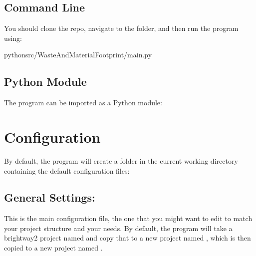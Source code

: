 \documentclass[letterpaper,10pt,english]{sphinxmanual}
\begin{document}
\section{Command Line}
\label{\detokenize{usage:command-line}}
\sphinxAtStartPar
You should clone the repo, navigate to the  folder, and then run the program using:

\begin{sphinxVerbatim}[commandchars=\\\{\}]
pythonsrc/WasteAndMaterialFootprint/main.py
\end{sphinxVerbatim}


\section{Python Module}
\label{\detokenize{usage:python-module}}
\sphinxAtStartPar
The program can be imported as a Python module:

\begin{sphinxVerbatim}[commandchars=\\\{\}]
   
\end{sphinxVerbatim}

\sphinxstepscope


\chapter{Configuration}
\label{\detokenize{configuration:configuration}}\label{\detokenize{configuration::doc}}
\sphinxAtStartPar
By default, the program will create a folder  in the current working directory containing the default configuration files:


\section{General Settings: }
\label{\detokenize{configuration:general-settings-user-settings-py}}
\sphinxAtStartPar
This is the main configuration file, the one that you might want to edit to match your project structure and your needs. By default, the program will take a brightway2 project named  and copy that to a new project named , which is then copied to a new project named .
\end{document}
